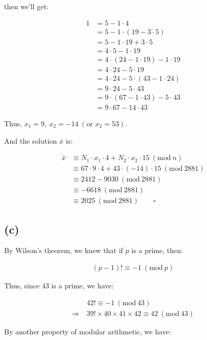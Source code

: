 \documentclass{article}
\newcommand{\modwos}[1]{\ (\mathrm{mod}\ #1)}
\begin{document}
then we'll get:

\begin{align*}
    1 
    &= 5 - 1 \cdot 4 \\
    &= 5 - 1 \cdot (19 - 3 \cdot 5) \\
    &= 5 - 1 \cdot 19 + 3 \cdot 5 \\
    &= 4 \cdot 5 - 1 \cdot 19 \\
    &= 4 \cdot (24 - 1 \cdot 19) - 1 \cdot 19 \\
    &= 4 \cdot 24 - 5 \cdot 19 \\
    &= 4 \cdot 24 - 5 \cdot (43 - 1 \cdot 24) \\
    &= 9 \cdot 24 - 5 \cdot 43 \\
    &= 9 \cdot (67 - 1 \cdot 43) - 5 \cdot 43 \\
    &= 9 \cdot 67 - 14 \cdot 43
\end{align*}

Thus, $x_1 = 9, \ x_2 = -14 \ (\text{or } x_2 = 53)$.
\bigskip

And the solution $\bar{x}$ is:

\begin{align*}
    \bar{x}
    &\equiv N_1 \cdot x_1 \cdot 4 + N_2 \cdot x_2 \cdot 15 \modwos{n} \\
    &\equiv 67 \cdot 9 \cdot 4 + 43 \cdot (-14) \cdot 15 \modwos{2881} \\
    &\equiv 2412 - 9030 \modwos{2881} \\
    &\equiv -6618 \modwos{2881} \\
    &\equiv 2025 \modwos{2881} \qquad \square
\end{align*}

\subsection*{(c)}

By Wilson's theorem, we knew that if $p$ is a prime, then:

\begin{align*}
    (p-1)! \equiv -1 \modwos{p}
\end{align*}

Thus, since $43$ is a prime, we have:

\begin{align*}
    &42! \equiv -1 \modwos{43} \\
    \Rightarrow \ & 39! \times 40 \times 41 \times 42 \equiv 42 \modwos{43}
\end{align*}

By another property of modular arithmetic, we have:
\end{document}
